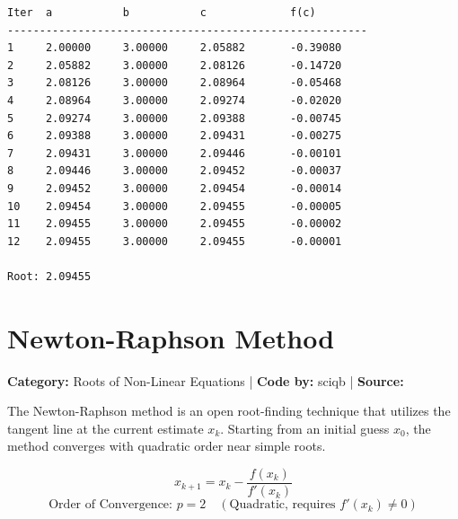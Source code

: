 \documentclass[10pt,a4paper]{report}
\begin{document}
\begin{tcolorbox}[colback=termbg,colframe=primary,title=\textbf{Program Execution Output \& Convergence Table},boxrule=1pt,arc=2mm]
\begin{lstlisting}[style=terminal_output]
Iter  a           b           c             f(c)        
--------------------------------------------------------
1     2.00000     3.00000     2.05882       -0.39080    
2     2.05882     3.00000     2.08126       -0.14720    
3     2.08126     3.00000     2.08964       -0.05468    
4     2.08964     3.00000     2.09274       -0.02020    
5     2.09274     3.00000     2.09388       -0.00745    
6     2.09388     3.00000     2.09431       -0.00275    
7     2.09431     3.00000     2.09446       -0.00101    
8     2.09446     3.00000     2.09452       -0.00037    
9     2.09452     3.00000     2.09454       -0.00014    
10    2.09454     3.00000     2.09455       -0.00005    
11    2.09455     3.00000     2.09455       -0.00002    
12    2.09455     3.00000     2.09455       -0.00001    

Root: 2.09455
\end{lstlisting}
\end{tcolorbox}

\newpage


\section{Newton-Raphson Method}
\textbf{Category:} \textcolor{secondary}{Roots of Non-Linear Equations} \quad | \quad \textbf{Code by:} \textcolor{secondary}{sciqb} \quad | \quad \textbf{Source:} \texttt{}

The Newton-Raphson method is an open root-finding technique that utilizes the tangent line at the current estimate $x_k$. Starting from an initial guess $x_0$, the method converges with quadratic order near simple roots.

\begin{tcolorbox}[colback=theorybg,colframe=theoryframe,title=\textbf{Mathematical Theory \& Formulation},boxrule=1pt,arc=2mm]
\[
x_{k+1} = x_k - \frac{f(x_k)}{f'(x_k)}
\]
\[
\text{Order of Convergence: } p = 2 \quad (\text{Quadratic, requires } f'(x_k) \neq 0)
\]
\end{tcolorbox}
\end{document}

